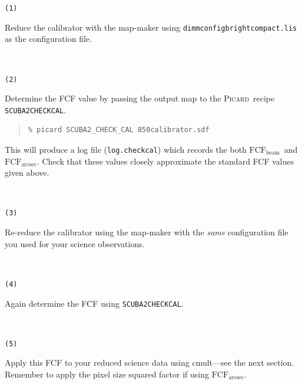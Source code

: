 \documentclass[twoside,11pt]{article}
\newcommand{\xref}[3]{#1}
\renewcommand{\_}{\texttt{\symbol{95}}}
\newenvironment{myquote}{
   \color{MidnightBlue}\begin{quote}\begin{small}}{
   \end{small}\end{quote}
}
\newcommand{\fcfb}{$\mathrm{FCF_{beam}}$}
\newcommand{\fcfa}{$\mathrm{FCF_{arcsec}}$}
\newcommand{\picard}{\xref{\textsc{Picard}}{sun265}{}}
\newcommand{\drrecipe}[1]{\texttt{#1}}
\newcommand{\task}[1]{\textsf{#1}}
\newcommand{\file}[1]{\texttt{#1}}
\newcommand{\cmult}{\xref{\task{cmult}}{sun95}{CMULT}}
\renewenvironment{myquote}{
      \begin{quote}\begin{small}}{
      \end{small}\end{quote}
   }
\begin{document}
\vspace{1mm}
\begin{minipage}[t]{0.05\linewidth}
\texttt{(1)}
\end{minipage}
\begin{minipage}[t]{0.95\linewidth}
Reduce the calibrator with the map-maker using
\file{dimmconfig\_bright\_compact.lis} as the configuration file.
\end{minipage}
\vspace{1mm}\\
\begin{minipage}[t]{0.05\linewidth}
\texttt{(2)}
\end{minipage}
\begin{minipage}[t]{0.95\linewidth}
Determine the FCF value by passing the output map to the
\picard\ recipe \xref{\drrecipe{SCUBA2\_CHECK\_CAL}}{sun265}{SCUBA2_CHECK_CAL}.
\begin{myquote}
\begin{verbatim}
% picard SCUBA2_CHECK_CAL 850calibrator.sdf
\end{verbatim}
\end{myquote}
This will produce a log file (\file{log.checkcal}) which records the both
\fcfb\ and \fcfa. Check that these values closely approximate the
standard FCF values given above.
\end{minipage}
\vspace{1mm}\\
\begin{minipage}[t]{0.05\linewidth}
\texttt{(3)}
\end{minipage}
\begin{minipage}[t]{0.95\linewidth}
Re-reduce the calibrator using the map-maker with the \emph{same}
configuration file you used for your science observations.
\end{minipage}
\vspace{1mm}\\
\begin{minipage}[t]{0.05\linewidth}
\texttt{(4)}
\end{minipage}
\begin{minipage}[t]{0.95\linewidth}
Again determine the FCF using \drrecipe{SCUBA2\_CHECK\_CAL}.
\end{minipage}
\vspace{1mm}\\
\begin{minipage}[t]{0.05\linewidth}
\texttt{(5)}
\end{minipage}
\begin{minipage}[t]{0.95\linewidth}
Apply this FCF to your reduced science data using \cmult---see the next
section. Remember to apply the pixel size squared factor if using
\fcfa.
\end{minipage}
\end{document}
